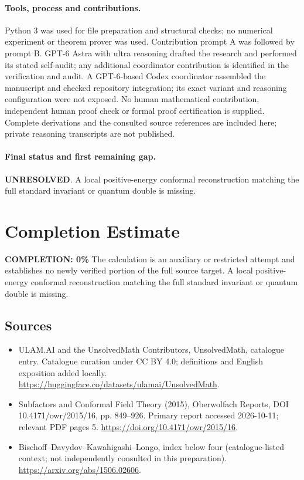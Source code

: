 \documentclass[11pt]{article}
\begin{document}
\paragraph{Tools, process and contributions.}
Python 3 was used for file preparation and structural checks; no numerical experiment or theorem prover was used. Contribution prompt A was followed by prompt B. GPT-6 Astra with ultra reasoning drafted the research and performed its stated self-audit; any additional coordinator contribution is identified in the verification and audit. A GPT-6-based Codex coordinator assembled the manuscript and checked repository integration; its exact variant and reasoning configuration were not exposed. No human mathematical contribution, independent human proof check or formal proof certification is supplied. Complete derivations and the consulted source references are included here; private reasoning transcripts are not published.

\paragraph{Final status and first remaining gap.}
\textbf{UNRESOLVED}. A local positive-energy conformal reconstruction matching the full standard invariant or quantum double is missing.

\section{Completion Estimate}
\noindent\textbf{COMPLETION: 0\%}
The calculation is an auxiliary or restricted attempt and establishes no newly verified portion of the full source target. A local positive-energy conformal reconstruction matching the full standard invariant or quantum double is missing.

\subsection{Sources}
\begin{itemize}
\item[\hypertarget{source:statement:1}{S1}] ULAM.AI and the UnsolvedMath Contributors, UnsolvedMath, catalogue entry. Catalogue curation under CC BY 4.0; definitions and English exposition added locally.
\url{https://huggingface.co/datasets/ulamai/UnsolvedMath}.
\item[\hypertarget{source:statement:2}{S2}] Subfactors and Conformal Field Theory (2015), Oberwolfach Reports, DOI 10.4171/owr/2015/16, pp. 849--926. Primary report accessed 2026-10-11; relevant PDF pages 5.
\url{https://doi.org/10.4171/owr/2015/16}.
\item[\hypertarget{source:statement:3}{S3}] Bischoff--Davydov--Kawahigashi--Longo, index below four (catalogue-listed context; not independently consulted in this preparation).
\url{https://arxiv.org/abs/1506.02606}.
\end{itemize}
\label{end:statement}
\end{document}
